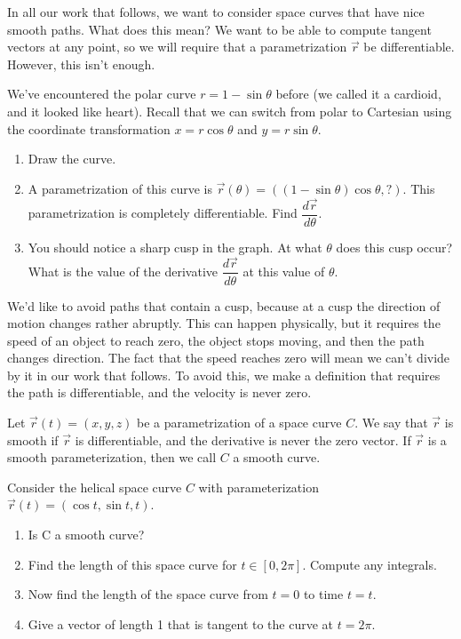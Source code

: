 In all our work that follows, we want to consider space curves that have nice smooth paths.  What does this mean?  We want to be able to compute tangent vectors at any point, so we will require that a parametrization $\vec r$ be differentiable.  However, this isn't enough.  
\begin{problem}
 We've encountered the polar curve $r = 1-\sin\theta$ before (we called it a cardioid, and it looked like heart).  Recall that we can switch from polar to Cartesian using the coordinate transformation $x=r\cos\theta$ and $y=r\sin\theta$. 
\begin{enumerate}
 \item Draw the curve.
 \item A parametrization of this curve is $\vec r(\theta) = ((1-\sin\theta)\cos\theta, ?)$.  This parametrization is completely differentiable.  Find $\dfrac{d\vec r}{d\theta}$.
 \item You should notice a sharp cusp in the graph. At what $\theta$ does this cusp occur?  What is the value of the derivative $\dfrac{d\vec r}{d\theta}$ at this value of $\theta$. 
\end{enumerate}
\end{problem}

We'd like to avoid paths that contain a cusp, because at a cusp the direction of motion changes rather abruptly. This can happen physically, but it requires the speed of an object to reach zero, the object stops moving, and then the path changes direction. The fact that the speed reaches zero will mean we can't divide by it in our work that follows.  To avoid this, we make a definition that requires the path is differentiable, and the velocity is never zero.

\begin{definition}
 Let $\vec r(t)=(x,y,z)$ be a parametrization of a space curve $C$. We say that $\vec r$ is smooth if $\vec r$ is differentiable, and the derivative is never the zero vector. If $\vec r$ is a smooth parameterization, then we call $C$ a smooth curve. 
\end{definition}


\begin{problem}%
%
 Consider the helical space curve $C$ with parameterization $\vec r(t)=(\cos t, \sin t, t)$. 
\begin{enumerate}
 \item Is C a smooth curve?  
 \item Find the length of this space curve for $t\in[0,2\pi]$. Compute any integrals. 
 \item Now find the length of the space curve from $t=0$ to time $t=t$. 
 \item Give a vector of length 1 that is tangent to the curve at $t=2\pi$. 
\end{enumerate}
\end{problem}

